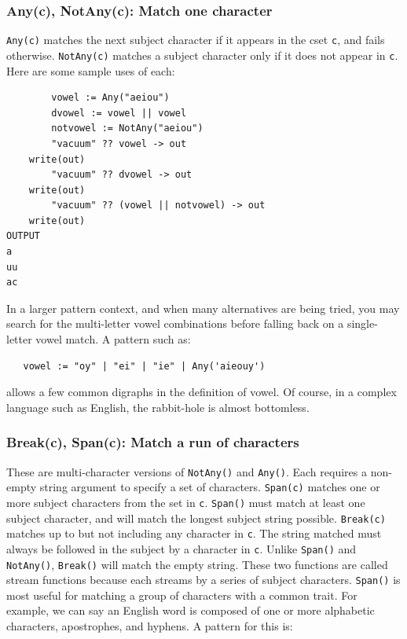 \documentclass[letterpaper,12pt]{article}
\begin{document}
\subsubsection{Any(c), NotAny(c): Match one character}

{\tt Any(c)} matches the next subject character if it appears in the cset
{\tt c}, and fails otherwise. {\tt NotAny(c)} matches a subject
character only if it does not appear in {\tt c}. Here are some sample
uses of each:

\begin{verbatim}
        vowel := Any("aeiou")
        dvowel := vowel || vowel
        notvowel := NotAny("aeiou")
        "vacuum" ?? vowel -> out
	write(out)
        "vacuum" ?? dvowel -> out
	write(out)
        "vacuum" ?? (vowel || notvowel) -> out
	write(out)
OUTPUT
a
uu
ac
\end{verbatim}

In a larger pattern context, and when many alternatives are being
tried, you may search for the multi-letter vowel combinations before
falling back on a single-letter vowel match. A pattern such as:

\begin{verbatim}
   vowel := "oy" | "ei" | "ie" | Any('aieouy')
\end{verbatim}

\noindent
allows a few common digraphs in the definition of vowel.  Of course, in
a complex language such as English, the rabbit-hole is almost bottomless.


\subsubsection{Break(c), Span(c): Match a run of characters}

These are multi-character versions of {\tt NotAny()} and {\tt Any()}.
Each requires a non-empty string argument to specify a set of characters.
{\tt Span(c)} matches one or more subject characters from the set in {\tt c}.
{\tt Span()} must
match at least one subject character, and will match the longest
subject string possible.  {\tt Break(c)} matches up to but not including
any character in {\tt c}. The string matched must always be followed in the
subject by a character in {\tt c}. Unlike {\tt Span()} and {\tt NotAny()},
{\tt Break()}
will match the empty string.  These two functions are called stream
functions because each streams by a series of subject
characters. {\tt Span()} is most useful for matching a group of characters
with a common trait. For example, we can say an English word is
composed of one or more alphabetic characters, apostrophes, and
hyphens. A pattern for this is:
\end{document}
